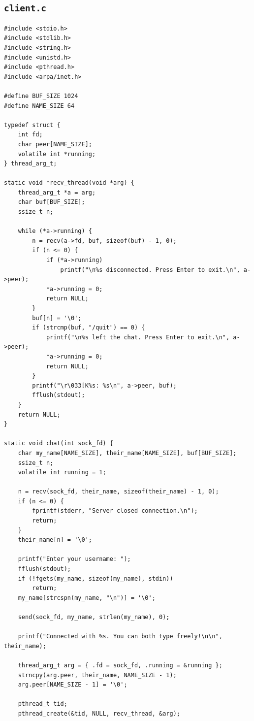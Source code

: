 \documentclass[12pt,a4paper]{article}
\begin{document}
\subsection{\texttt{client.c}}

\begin{lstlisting}[caption={\texttt{client.c} --- client de chat full-duplex multithreadé}]
#include <stdio.h>
#include <stdlib.h>
#include <string.h>
#include <unistd.h>
#include <pthread.h>
#include <arpa/inet.h>

#define BUF_SIZE 1024
#define NAME_SIZE 64

typedef struct {
    int fd;
    char peer[NAME_SIZE];
    volatile int *running;
} thread_arg_t;

static void *recv_thread(void *arg) {
    thread_arg_t *a = arg;
    char buf[BUF_SIZE];
    ssize_t n;

    while (*a->running) {
        n = recv(a->fd, buf, sizeof(buf) - 1, 0);
        if (n <= 0) {
            if (*a->running)
                printf("\n%s disconnected. Press Enter to exit.\n", a->peer);
            *a->running = 0;
            return NULL;
        }
        buf[n] = '\0';
        if (strcmp(buf, "/quit") == 0) {
            printf("\n%s left the chat. Press Enter to exit.\n", a->peer);
            *a->running = 0;
            return NULL;
        }
        printf("\r\033[K%s: %s\n", a->peer, buf);
        fflush(stdout);
    }
    return NULL;
}

static void chat(int sock_fd) {
    char my_name[NAME_SIZE], their_name[NAME_SIZE], buf[BUF_SIZE];
    ssize_t n;
    volatile int running = 1;

    n = recv(sock_fd, their_name, sizeof(their_name) - 1, 0);
    if (n <= 0) {
        fprintf(stderr, "Server closed connection.\n");
        return;
    }
    their_name[n] = '\0';

    printf("Enter your username: ");
    fflush(stdout);
    if (!fgets(my_name, sizeof(my_name), stdin))
        return;
    my_name[strcspn(my_name, "\n")] = '\0';

    send(sock_fd, my_name, strlen(my_name), 0);

    printf("Connected with %s. You can both type freely!\n\n", their_name);

    thread_arg_t arg = { .fd = sock_fd, .running = &running };
    strncpy(arg.peer, their_name, NAME_SIZE - 1);
    arg.peer[NAME_SIZE - 1] = '\0';

    pthread_t tid;
    pthread_create(&tid, NULL, recv_thread, &arg);


\end{lstlisting}
\end{document}
